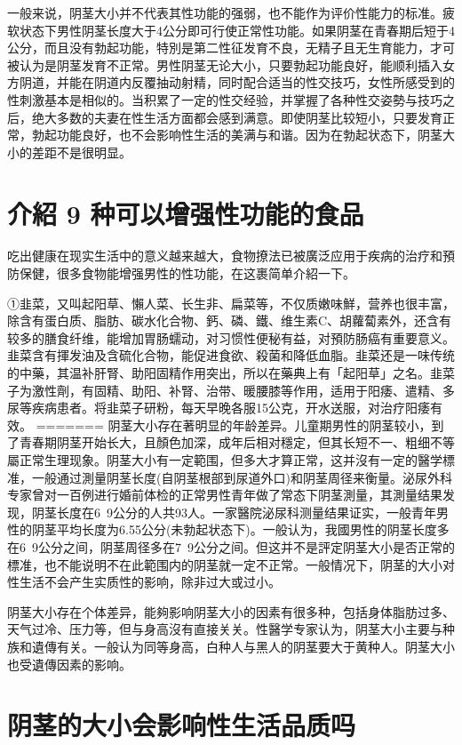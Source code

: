 \documentclass[12pt,UTF8]{ctexbook}
\begin{document}
一般来说，阴茎大小并不代表其性功能的强弱，也不能作为评价性能力的标准。疲软状态下男性阴茎长度大于4公分即可行使正常性功能。如果阴茎在青春期后短于4公分，而且没有勃起功能，特別是第二性征发育不良，无精子且无生育能力，才可被认为是阴茎发育不正常。男性阴茎无论大小，只要勃起功能良好，能顺利插入女方阴道，并能在阴道内反覆抽动射精，同时配合适当的性交技巧，女性所感受到的性刺激基本是相似的。当积累了一定的性交经验，并掌握了各种性交姿勢与技巧之后，绝大多数的夫妻在性生活方面都会感到满意。即使阴茎比较短小，只要发育正常，勃起功能良好，也不会影响性生活的美满与和谐。因为在勃起状态下，阴茎大小的差距不是很明显。

\section{介紹 9 种可以增强性功能的食品}

吃出健康在现实生活中的意义越来越大，食物撩法已被廣泛应用于疾病的治疗和預防保健，很多食物能增强男性的性功能，在这裹简单介紹一下。

①韭菜，又叫起阳草、懶人菜、长生非、扁菜等，不仅质嫩味鮮，营养也很丰富，除含有蛋白质、脂肪、碳水化合物、鈣、磷、鐵、维生素C、胡蘿蔔素外，还含有较多的膳食纤维，能增加胃肠蠕动，对习惯性便秘有益，对預防肠癌有重要意义。韭菜含有揮发油及含硫化合物，能促进食欲、殺菌和降低血脂。韭菜还是一味传统的中藥，其温补肝腎、助阳固精作用突出，所以在藥典上有「起阳草」之名。韭菜子为激性劑，有固精、助阳、补腎、治带、暖腰膝等作用，适用于阳痿、遣精、多尿等疾病患者。将韭菜子研粉，每天早晚各服15公克，开水送服，对治疗阳痿有效。
=======
阴茎大小存在著明显的年龄差异。儿童期男性的阴茎较小，到了青春期阴茎开始长大，且顏色加深，成年后相对穩定，但其长短不一、粗细不等屬正常生理现象。阴茎大小有一定範围，但多大才算正常，这并沒有一定的醫学標准，一般通过測量阴茎长度(自阴茎根部到尿道外口)和阴茎周径来衡量。泌尿外科专家曾对一百例进行婚前体检的正常男性青年做了常态下阴茎測量，其測量结果发现，阴茎长度在6~9公分的人共93人。一家醫院泌尿科测量结果证实，一般青年男性的阴茎平均长度为6.55公分(未勃起状态下)。一般认为，我國男性的阴茎长度多在6~9公分之间，阴茎周径多在7~9公分之间。但这并不是評定阴茎大小是否正常的標准，也不能说明不在此範围内的阴茎就一定不正常。一般情况下，阴茎的大小对性生活不会产生实质性的影响，除非过大或过小。

阴茎大小存在个体差异，能夠影响阴茎大小的因素有很多种，包括身体脂肪过多、天气过冷、压力等，但与身高沒有直接关关。性醫学专家认为，阴茎大小主要与种族和遺傳有关。一般认为同等身高，白种人与黑人的阴茎要大于黄种人。阴茎大小也受遺傳因素的影响。

\section{阴茎的大小会影响性生活品质吗}
\end{document}
